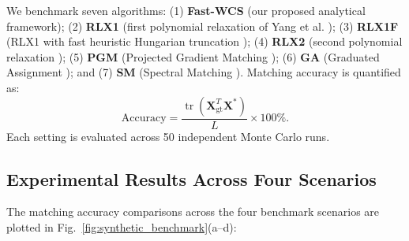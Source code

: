 \documentclass[conference]{IEEEtran}
\begin{document}
We benchmark seven algorithms: (1) \textbf{Fast-WCS} (our proposed analytical framework); (2) \textbf{RLX1} (first polynomial relaxation of Yang et al. \cite{yang2018algorithm}); (3) \textbf{RLX1F} (RLX1 with fast heuristic Hungarian truncation \cite{yang2018algorithm}); (4) \textbf{RLX2} (second polynomial relaxation \cite{yang2018algorithm}); (5) \textbf{PGM} (Projected Gradient Matching \cite{zaslavskiy2009}); (6) \textbf{GA} (Graduated Assignment \cite{gold1996}); and (7) \textbf{SM} (Spectral Matching \cite{leordeanu2005}). Matching accuracy is quantified as:
\begin{equation}
\text{Accuracy} = \frac{\operatorname{tr}(\mathbf{X}_{\text{gt}}^T \mathbf{X}^*)}{L} \times 100\%.
\end{equation}
Each setting is evaluated across 50 independent Monte Carlo runs.

\subsection{Experimental Results Across Four Scenarios}

The matching accuracy comparisons across the four benchmark scenarios are plotted in Fig.~\ref{fig:synthetic_benchmark}(a--d):
\end{document}
